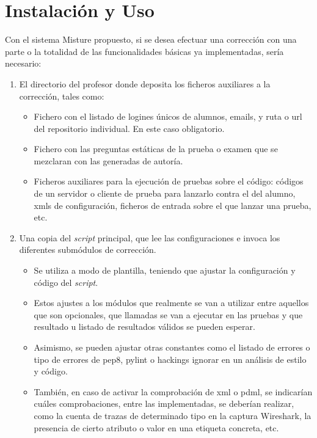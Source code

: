 \cleardoublepage
\appendix
\chapter{Instalación y Uso}
\label{app:instalacion}


Con el sistema Misture propuesto, si se desea efectuar una corrección con una parte o la totalidad de las funcionalidades básicas ya implementadas, sería necesario:\\

\begin{enumerate}
\item El directorio del profesor donde deposita los ficheros auxiliares a la corrección, tales como:

\begin{itemize}
\item Fichero con el listado de logines únicos de alumnos, emails, y ruta o url del repositorio individual. En este caso obligatorio.

\item Fichero con las preguntas estáticas de la prueba o examen que se mezclaran con las generadas de autoría.

\item Ficheros auxiliares para la ejecución de pruebas sobre el código: códigos de un servidor o cliente de prueba para lanzarlo contra el del alumno, xmls de configuración, ficheros de entrada sobre el que lanzar una prueba, etc.
\end{itemize}


\item Una copia del \textit{script} principal, que lee las configuraciones e invoca los diferentes submódulos de corrección.

\begin{itemize}
\item Se utiliza a modo de plantilla, teniendo que ajustar la configuración y código del \textit{script}.

\item Estos ajustes a los módulos que realmente se van a utilizar entre aquellos que son opcionales, que llamadas se van a ejecutar en las pruebas y que resultado u listado de resultados válidos se pueden esperar.

\item Asimismo, se pueden ajustar otras constantes como el listado de errores o tipo de errores de pep8, pylint o hackings ignorar en un análisis de estilo y código.

\item También, en caso de activar la comprobación de xml o pdml, se indicarían cuáles comprobaciones, entre las implementadas, se deberían realizar, como la cuenta de trazas de determinado tipo en la captura Wireshark, la presencia de cierto atributo o valor en una etiqueta concreta, etc.
\end{itemize}
\end{enumerate}

